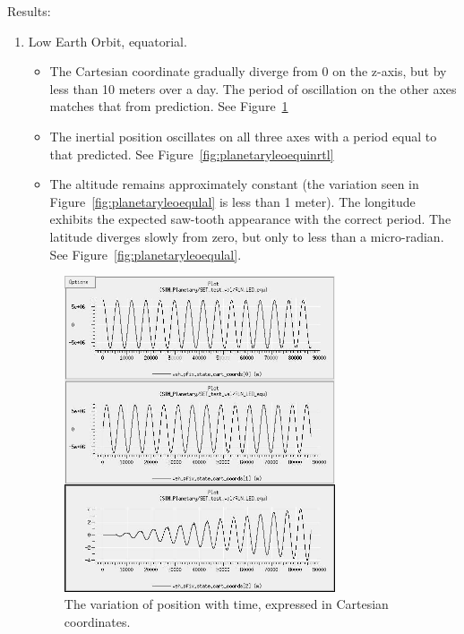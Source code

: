\begin{description}
\begin{enumerate}
\end{enumerate}

\item{Results:}
\begin{enumerate}
 \item {Low Earth Orbit, equatorial.}
\begin{itemize}
\item{}The Cartesian coordinate gradually diverge from 0 on the z-axis, but by less than 10 meters over a day.  The period of oscillation on the other axes matches that from prediction.  See Figure~\ref{fig:planetaryleoequcart}
\item{}The inertial position oscillates on all three axes with a period equal to that predicted.  See Figure~\ref{fig:planetaryleoequinrtl}
\item{}The altitude remains approximately constant (the variation seen in Figure~\ref{fig:planetaryleoequlal} is less than 1 meter). The longitude exhibits the expected saw-tooth appearance with the correct period. The latitude diverges slowly from zero, but only to less than a micro-radian.  See Figure~\ref{fig:planetaryleoequlal}.
\end{itemize}

\begin{figure}[!ht]
  \begin{center}
        \includegraphics[width=80mm]{figures/planetary_leo_equ_cart.jpg}
        \caption{The variation of position with time, expressed in Cartesian coordinates.} 
        \label{fig:planetaryleoequcart}
  \end{center}
\end{figure}


\end{enumerate}
\end{description}
